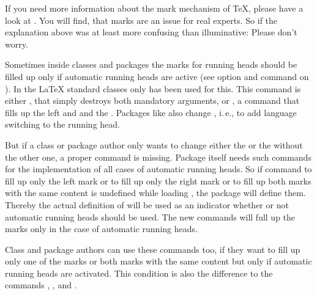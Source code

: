   If you need more information about the mark mechanism of \TeX, please have a
  look at \cite[chapter~23]{knuth:texbook}. You will find, that marks are an
  issue for real experts. So if the explanation above was at least more
  confusing than illuminative: Please don't worry.%
  \EndIndexGroup


  \begin{Declaration}
  \end{Declaration}
  Sometimes inside classes and packages the marks for running heads should be
  filled up only if automatic running heads are active (see option
   and command
   on
  ). In the \LaTeX{} standard
  classes only  has been used for this. This command is either
  , that simply destroys both mandatory arguments, or
  , a command that fills up the left and
   and the . Packages like
   also change \Macro{\@mkboth}, i.\,e., to add language
  switching to the running head.

  But if a class or package author only wants to change either the  or the  without the other one, a proper command is
  missing. Package  itself needs such commands for the
  implementation of all cases of automatic running heads. So if command
   to fill up only the left mark or  to fill up
  only the right mark or  to fill up both marks with the same
  content is undefined while loading , the package will
  define them. Thereby the actual definition of  will be used
  as an indicator whether or not automatic running heads should be used. The
  new commands will full up the marks only in the case of automatic running
  heads.

  Class and package authors can use these commands too, if they want to fill
  up only one of the marks or both marks with the same content but only if
  automatic running heads are activated. This condition is also the difference
  to the commands , , and .%
  \EndIndexGroup
\fi

%
\EndIndexGroup

